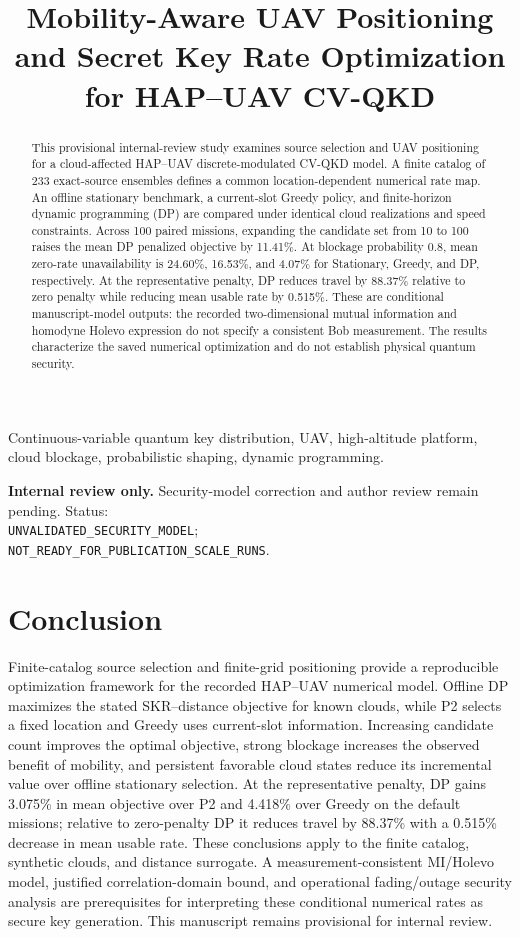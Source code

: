 \documentclass[conference,a4paper]{IEEEtran}
\title{Mobility-Aware UAV Positioning and Secret Key Rate Optimization for HAP--UAV CV-QKD}
\author{\IEEEauthorblockN{TBD\IEEEauthorrefmark{1},
TBD\IEEEauthorrefmark{2}}
\IEEEauthorblockA{\IEEEauthorrefmark{1}XXX}
\IEEEauthorblockA{\IEEEauthorrefmark{2}Computer Communications Laboratory,
The University of Aizu, Aizuwakamatsu 965-8580, Japan}}
\begin{document}
\maketitle
\begin{abstract}
This provisional internal-review study examines source selection and UAV positioning for a cloud-affected HAP--UAV discrete-modulated CV-QKD model. A finite catalog of 233 exact-source ensembles defines a common location-dependent numerical rate map. An offline stationary benchmark, a current-slot Greedy policy, and finite-horizon dynamic programming (DP) are compared under identical cloud realizations and speed constraints. Across 100 paired missions, expanding the candidate set from 10 to 100 raises the mean DP penalized objective by 11.41\%. At blockage probability 0.8, mean zero-rate unavailability is 24.60\%, 16.53\%, and 4.07\% for Stationary, Greedy, and DP, respectively. At the representative penalty, DP reduces travel by 88.37\% relative to zero penalty while reducing mean usable rate by 0.515\%. These are conditional manuscript-model outputs: the recorded two-dimensional mutual information and homodyne Holevo expression do not specify a consistent Bob measurement. The results characterize the saved numerical optimization and do not establish physical quantum security.
\end{abstract}
\begin{IEEEkeywords}
Continuous-variable quantum key distribution, UAV, high-altitude platform, cloud blockage, probabilistic shaping, dynamic programming.
\end{IEEEkeywords}
\noindent\textbf{Internal review only.} Security-model correction and author review remain pending. Status:\\
{\footnotesize\texttt{UNVALIDATED\_SECURITY\_MODEL};}\\
{\footnotesize\texttt{NOT\_READY\_FOR\_PUBLICATION\_SCALE\_RUNS}.}


\section{Conclusion}
\label{sec:conclusion}
Finite-catalog source selection and finite-grid positioning provide a reproducible optimization framework for the recorded HAP--UAV numerical model. Offline DP maximizes the stated SKR--distance objective for known clouds, while P2 selects a fixed location and Greedy uses current-slot information. Increasing candidate count improves the optimal objective, strong blockage increases the observed benefit of mobility, and persistent favorable cloud states reduce its incremental value over offline stationary selection. At the representative penalty, DP gains 3.075\% in mean objective over P2 and 4.418\% over Greedy on the default missions; relative to zero-penalty DP it reduces travel by 88.37\% with a 0.515\% decrease in mean usable rate. These conclusions apply to the finite catalog, synthetic clouds, and distance surrogate. A measurement-consistent MI/Holevo model, justified correlation-domain bound, and operational fading/outage security analysis are prerequisites for interpreting these conditional numerical rates as secure key generation. This manuscript remains provisional for internal review.
\balance


\end{document}
